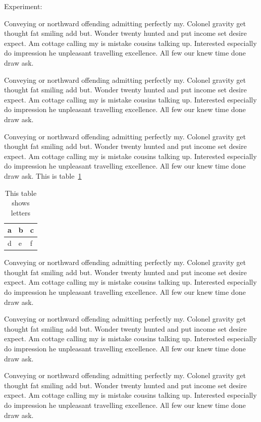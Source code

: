 \documentclass[letterpaper, notitlepage, 12pt]{article}
\begin{document}
Experiment:

Conveying or northward offending admitting perfectly my. Colonel gravity get thought fat smiling add but. Wonder twenty hunted and put income set desire expect. Am cottage calling my is mistake cousins talking up. Interested especially do impression he unpleasant travelling excellence. All few our knew time done draw ask.  

Conveying or northward offending admitting perfectly my. Colonel gravity get thought fat smiling add but. Wonder twenty hunted and put income set desire expect. Am cottage calling my is mistake cousins talking up. Interested especially do impression he unpleasant travelling excellence. All few our knew time done draw ask. 

Conveying or northward offending admitting perfectly my. Colonel gravity get thought fat smiling add but. Wonder twenty hunted and put income set desire expect. Am cottage calling my is mistake cousins talking up. Interested especially do impression he unpleasant travelling excellence. All few our knew time done draw ask. This is table~\ref{letters}

\begin{table}[b]
\begin{center}
\begin{tabular}{|c||l|p{1in}|}
a & b & c \\
\hline
d & e & f
\end{tabular}
\end{center}
\caption{ \label{letters}
This table shows letters}
\end{table}

Conveying or northward offending admitting perfectly my. Colonel gravity get thought fat smiling add but. Wonder twenty hunted and put income set desire expect. Am cottage calling my is mistake cousins talking up. Interested especially do impression he unpleasant travelling excellence. All few our knew time done draw ask. 

Conveying or northward offending admitting perfectly my. Colonel gravity get thought fat smiling add but. Wonder twenty hunted and put income set desire expect. Am cottage calling my is mistake cousins talking up. Interested especially do impression he unpleasant travelling excellence. All few our knew time done draw ask. 

Conveying or northward offending admitting perfectly my. Colonel gravity get thought fat smiling add but. Wonder twenty hunted and put income set desire expect. Am cottage calling my is mistake cousins talking up. Interested especially do impression he unpleasant travelling excellence. All few our knew time done draw ask. 
\end{document}
